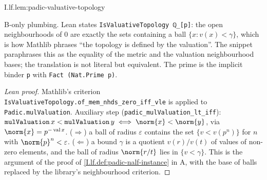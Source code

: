 \begin{lemma}
\bonly
{}
\end{lemma}
\begin{tfformal}{I.lf.lem:padic-valuative-topology}
\begin{tffidelity}
B-only plumbing. Lean states \texttt{IsValuativeTopology ℚ\_[p]}: the open neighbourhoods of $0$ are exactly the sets containing a ball $\{x:v(x)<\gamma\}$, which is how Mathlib phrases ``the topology is defined by the valuation''. The snippet paraphrases this as the equality of the metric and the valuation neighbourhood bases; the translation is not literal but equivalent. The prime is the implicit binder \texttt{p} with \texttt{Fact (Nat.Prime p)}.
\end{tffidelity}
\end{tfformal}
\begin{proof}[Lean proof]
Mathlib's criterion \texttt{IsValuativeTopology.of\_mem\_nhds\_zero\_iff\_vle} is applied to \texttt{Padic.mulValuation}. Auxiliary step (\texttt{padic\_mulValuation\_lt\_iff}): $\texttt{mulValuation}\,x<\texttt{mulValuation}\,y\iff\norm{x}<\norm{y}$, via $\norm{x}=p^{-\operatorname{val}x}$. ($\Rightarrow$) a ball of radius $\varepsilon$ contains the set $\{v<v(p^n)\}$ for $n$ with $\norm{p}^n<\varepsilon$. ($\Leftarrow$) a bound $\gamma$ is a quotient $v(r)/v(t)$ of values of non-zero elements, and the ball of radius $\norm{r/t}$ lies in $\{v<\gamma\}$. This is the argument of the proof of \cref{I.lf.def:padic-nalf-instance} in A, with the base of balls replaced by the library's neighbourhood criterion.
\end{proof}

